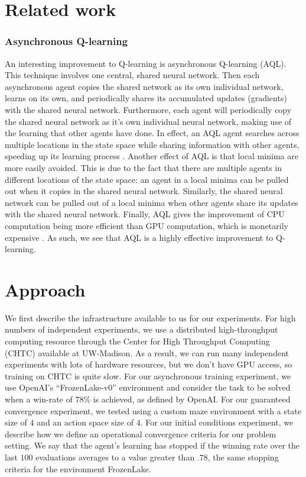 \documentclass[twocolumn]{article}
\begin{document}
	
	\section*{Related work} 
	\subsubsection*{Asynchronous Q-learning}
	An interesting improvement to Q-learning is asynchronous Q-learning (AQL). 
	This technique involves one central, shared neural network. Then each 
	asynchronous agent copies the shared network as its own individual 
	network, learns on its own, and periodically shares its accumulated updates 
	(gradients) with the shared neural network. Furthermore, each agent will 
	periodically copy the shared neural network as it's own individual neural 
	network, making use of the learning that other agents have done. In effect, 
	an AQL agent searches across multiple locations in the state space while 
	sharing information with other agents, speeding up its learning process 
	\cite{Mnih3}. Another effect of AQL is that local minima are more easily 
	avoided. This is due to the fact that there are multiple agents in 
	different locations of the state space: an agent in a local minima can be 
	pulled out when it copies in the shared neural network. Similarly, the 
	shared neural network can be pulled out of a local minima when other agents 
	share its updates with the shared neural network. Finally, AQL gives the 
	improvement of CPU computation being more efficient than GPU computation, 
	which is monetarily expensive \cite{Mnih3}. As such, we see that AQL is a 
	highly effective improvement to Q-learning.\\

	
	\section*{Approach} 
	We first describe the infrastructure available to us for our experiments. 
	For high numbers of independent experiments, we use a distributed 
	high-throughput computing resource through the Center for High Throughput 
	Computing (CHTC) available at UW-Madison. As a result, we can run many 
	independent experiments with lots of hardware resources, but we don't have 
	GPU access,	so training on CHTC is quite slow. 	For our asynchronous 
	training experiment, we use OpenAI's ``FrozenLake-v0'' environment and 
	consider the task to be solved when a win-rate of $78\%$ is achieved, as 
	defined by OpenAI. For our guaranteed convergence experiment, we tested 
	using a custom maze environment with a state size of $4$ and an action 
	space size of $4$. For our initial conditions experiment, we describe how 
	we define an operational convergence criteria for our problem setting. We 
	say that the agent's learning has stopped if the winning rate over the last 
	$100$ evaluations averages to a value greater than $.78$, the same stopping 
	criteria for the environment FrozenLake.\\
	
\end{document}

